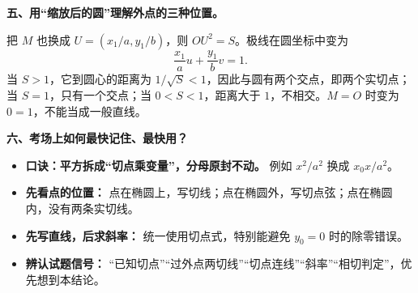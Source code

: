 \begin{explanationbox}
\medskip
\textbf{五、用“缩放后的圆”理解外点的三种位置。}

把 $M$ 也换成 $U=(x_1/a,y_1/b)$，则 $OU^2=S$。极线在圆坐标中变为
\[
 \frac{x_1}{a}u+\frac{y_1}{b}v=1.
\]
当 $S>1$，它到圆心的距离为 $1/\sqrt S<1$，因此与圆有两个交点，即两个实切点；当 $S=1$，只有一个交点；当 $0<S<1$，距离大于 $1$，不相交。$M=O$ 时变为 $0=1$，不能当成一般直线。

\medskip
\textbf{六、考场上如何最快记住、最快用？}
\begin{itemize}
    \item \textbf{口诀：平方拆成“切点乘变量”，分母原封不动。} 例如 $x^2/a^2$ 换成 $x_0x/a^2$。
    \item \textbf{先看点的位置：} 点在椭圆上，写切线；点在椭圆外，写切点弦；点在椭圆内，没有两条实切线。
    \item \textbf{先写直线，后求斜率：} 统一使用切点式，特别能避免 $y_0=0$ 时的除零错误。
    \item \textbf{辨认试题信号：} “已知切点”“过外点两切线”“切点连线”“斜率”“相切判定”，优先想到本结论。
\end{itemize}
\end{explanationbox}

